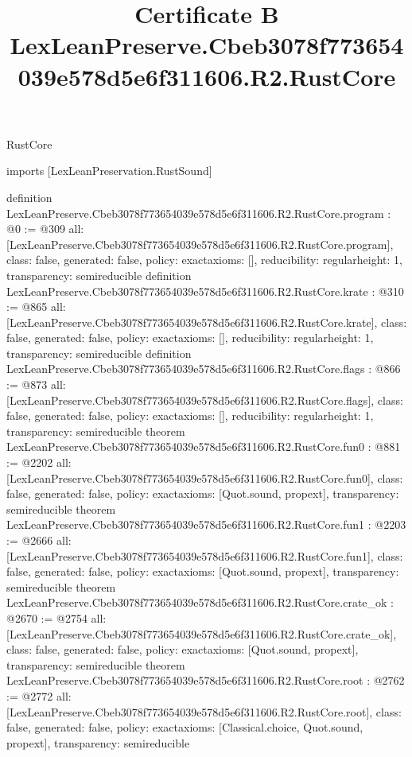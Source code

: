 \begin{lexlean}{RustCore}
\title{Certificate B LexLeanPreserve.Cbeb3078f773654039e578d5e6f311606.R2.RustCore}
\begin{coremodule}
imports [LexLeanPreservation.RustSound]

definition LexLeanPreserve.Cbeb3078f773654039e578d5e6f311606.R2.RustCore.program : @0 := @309 {
  all: [LexLeanPreserve.Cbeb3078f773654039e578d5e6f311606.R2.RustCore.program],
  class: false,
  generated: false,
  policy: exact{axioms: []},
  reducibility: regular{height: 1},
  transparency: semireducible
}
definition LexLeanPreserve.Cbeb3078f773654039e578d5e6f311606.R2.RustCore.krate : @310 := @865 {
  all: [LexLeanPreserve.Cbeb3078f773654039e578d5e6f311606.R2.RustCore.krate],
  class: false,
  generated: false,
  policy: exact{axioms: []},
  reducibility: regular{height: 1},
  transparency: semireducible
}
definition LexLeanPreserve.Cbeb3078f773654039e578d5e6f311606.R2.RustCore.flags : @866 := @873 {
  all: [LexLeanPreserve.Cbeb3078f773654039e578d5e6f311606.R2.RustCore.flags],
  class: false,
  generated: false,
  policy: exact{axioms: []},
  reducibility: regular{height: 1},
  transparency: semireducible
}
theorem LexLeanPreserve.Cbeb3078f773654039e578d5e6f311606.R2.RustCore.fun0 : @881 := @2202 {
  all: [LexLeanPreserve.Cbeb3078f773654039e578d5e6f311606.R2.RustCore.fun0],
  class: false,
  generated: false,
  policy: exact{axioms: [Quot.sound, propext]},
  transparency: semireducible
}
theorem LexLeanPreserve.Cbeb3078f773654039e578d5e6f311606.R2.RustCore.fun1 : @2203 := @2666 {
  all: [LexLeanPreserve.Cbeb3078f773654039e578d5e6f311606.R2.RustCore.fun1],
  class: false,
  generated: false,
  policy: exact{axioms: [Quot.sound, propext]},
  transparency: semireducible
}
theorem LexLeanPreserve.Cbeb3078f773654039e578d5e6f311606.R2.RustCore.crate_ok : @2670 := @2754 {
  all: [LexLeanPreserve.Cbeb3078f773654039e578d5e6f311606.R2.RustCore.crate_ok],
  class: false,
  generated: false,
  policy: exact{axioms: [Quot.sound, propext]},
  transparency: semireducible
}
theorem LexLeanPreserve.Cbeb3078f773654039e578d5e6f311606.R2.RustCore.root : @2762 := @2772 {
  all: [LexLeanPreserve.Cbeb3078f773654039e578d5e6f311606.R2.RustCore.root],
  class: false,
  generated: false,
  policy: exact{axioms: [Classical.choice, Quot.sound, propext]},
  transparency: semireducible
}


\end{coremodule}
\end{lexlean}
